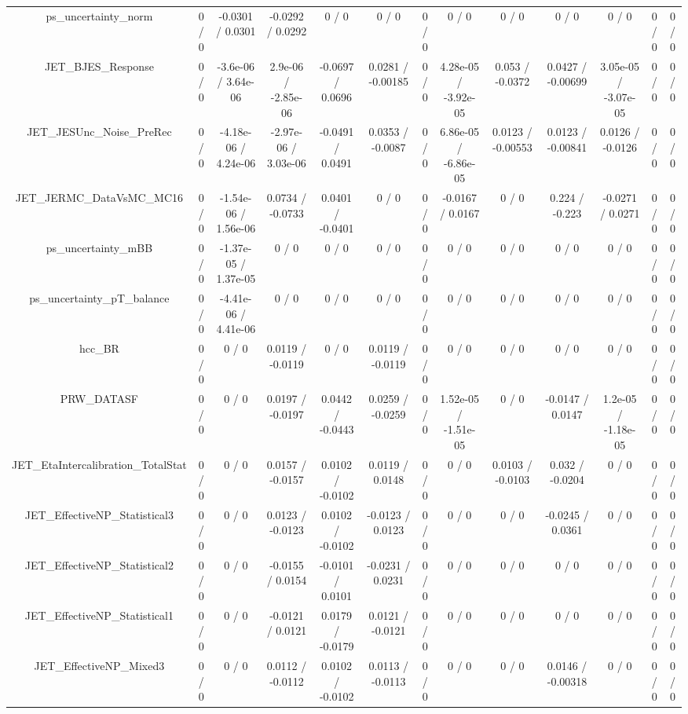 \documentclass[10pt]{article}
\begin{document}
\begin{table}[htbp]
\begin{center}
\begin{tabular}{|c|c|c|c|c|c|c|c|c|c|c|c|c|}
  ps_uncertainty_norm & 0 / 0 & -0.0301 / 0.0301 & -0.0292 / 0.0292 & 0 / 0 & 0 / 0 & 0 / 0 & 0 / 0 & 0 / 0 & 0 / 0 & 0 / 0 & 0 / 0 & 0 / 0 \\ 
  JET_BJES_Response & 0 / 0 & -3.6e-06 / 3.64e-06 & 2.9e-06 / -2.85e-06 & -0.0697 / 0.0696 & 0.0281 / -0.00185 & 0 / 0 & 4.28e-05 / -3.92e-05 & 0.053 / -0.0372 & 0.0427 / -0.00699 & 3.05e-05 / -3.07e-05 & 0 / 0 & 0 / 0 \\ 
  JET_JESUnc_Noise_PreRec & 0 / 0 & -4.18e-06 / 4.24e-06 & -2.97e-06 / 3.03e-06 & -0.0491 / 0.0491 & 0.0353 / -0.0087 & 0 / 0 & 6.86e-05 / -6.86e-05 & 0.0123 / -0.00553 & 0.0123 / -0.00841 & 0.0126 / -0.0126 & 0 / 0 & 0 / 0 \\ 
  JET_JERMC_DataVsMC_MC16 & 0 / 0 & -1.54e-06 / 1.56e-06 & 0.0734 / -0.0733 & 0.0401 / -0.0401 & 0 / 0 & 0 / 0 & -0.0167 / 0.0167 & 0 / 0 & 0.224 / -0.223 & -0.0271 / 0.0271 & 0 / 0 & 0 / 0 \\ 
  ps_uncertainty_mBB & 0 / 0 & -1.37e-05 / 1.37e-05 & 0 / 0 & 0 / 0 & 0 / 0 & 0 / 0 & 0 / 0 & 0 / 0 & 0 / 0 & 0 / 0 & 0 / 0 & 0 / 0 \\ 
  ps_uncertainty_pT_balance & 0 / 0 & -4.41e-06 / 4.41e-06 & 0 / 0 & 0 / 0 & 0 / 0 & 0 / 0 & 0 / 0 & 0 / 0 & 0 / 0 & 0 / 0 & 0 / 0 & 0 / 0 \\ 
  hcc_BR & 0 / 0 & 0 / 0 & 0.0119 / -0.0119 & 0 / 0 & 0.0119 / -0.0119 & 0 / 0 & 0 / 0 & 0 / 0 & 0 / 0 & 0 / 0 & 0 / 0 & 0 / 0 \\ 
  PRW_DATASF & 0 / 0 & 0 / 0 & 0.0197 / -0.0197 & 0.0442 / -0.0443 & 0.0259 / -0.0259 & 0 / 0 & 1.52e-05 / -1.51e-05 & 0 / 0 & -0.0147 / 0.0147 & 1.2e-05 / -1.18e-05 & 0 / 0 & 0 / 0 \\ 
  JET_EtaIntercalibration_TotalStat & 0 / 0 & 0 / 0 & 0.0157 / -0.0157 & 0.0102 / -0.0102 & 0.0119 / 0.0148 & 0 / 0 & 0 / 0 & 0.0103 / -0.0103 & 0.032 / -0.0204 & 0 / 0 & 0 / 0 & 0 / 0 \\ 
  JET_EffectiveNP_Statistical3 & 0 / 0 & 0 / 0 & 0.0123 / -0.0123 & 0.0102 / -0.0102 & -0.0123 / 0.0123 & 0 / 0 & 0 / 0 & 0 / 0 & -0.0245 / 0.0361 & 0 / 0 & 0 / 0 & 0 / 0 \\ 
  JET_EffectiveNP_Statistical2 & 0 / 0 & 0 / 0 & -0.0155 / 0.0154 & -0.0101 / 0.0101 & -0.0231 / 0.0231 & 0 / 0 & 0 / 0 & 0 / 0 & 0 / 0 & 0 / 0 & 0 / 0 & 0 / 0 \\ 
  JET_EffectiveNP_Statistical1 & 0 / 0 & 0 / 0 & -0.0121 / 0.0121 & 0.0179 / -0.0179 & 0.0121 / -0.0121 & 0 / 0 & 0 / 0 & 0 / 0 & 0 / 0 & 0 / 0 & 0 / 0 & 0 / 0 \\ 
  JET_EffectiveNP_Mixed3 & 0 / 0 & 0 / 0 & 0.0112 / -0.0112 & 0.0102 / -0.0102 & 0.0113 / -0.0113 & 0 / 0 & 0 / 0 & 0 / 0 & 0.0146 / -0.00318 & 0 / 0 & 0 / 0 & 0 / 0 \\ 

\end{tabular}
\end{center}
\end{table}
\end{document}
